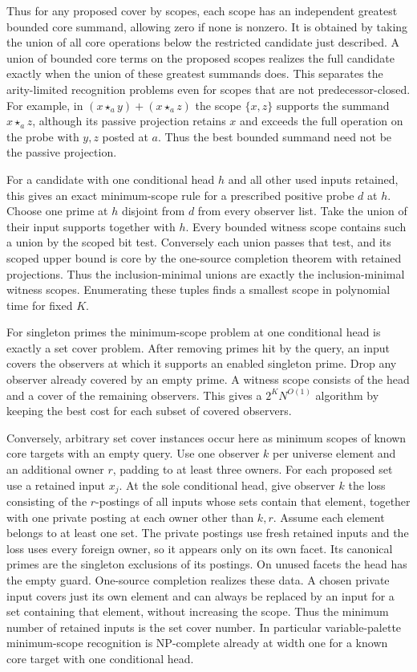 Thus for any proposed cover by scopes, each scope has an
independent greatest bounded core summand, allowing zero if
none is nonzero. It is obtained by taking the union of all
core operations below the restricted candidate just described.
A union of bounded core terms on the proposed scopes realizes
the full candidate exactly when the union of these greatest
summands does. This separates the arity-limited recognition
problems even for scopes that are not predecessor-closed.
For example, in $(x\star_a y)+(x\star_a z)$ the scope
$\{x,z\}$ supports the summand $x\star_a z$, although its
passive projection retains $x$ and exceeds the full operation
on the probe with $y,z$ posted at $a$. Thus the best bounded
summand need not be the passive projection.

For a candidate with one conditional head $h$ and
all other used inputs retained, this gives an exact
minimum-scope rule for a prescribed positive probe $d$
at $h$. Choose one prime at $h$ disjoint from $d$
from every observer list. Take the union of their
input supports together with $h$. Every bounded
witness scope contains such a union by the scoped
bit test. Conversely each union passes that test,
and its scoped upper bound is core by the one-source
completion theorem with retained projections.
Thus the inclusion-minimal unions are exactly the
inclusion-minimal witness scopes. Enumerating these
tuples finds a smallest scope in polynomial time
for fixed $K$.

For singleton primes the minimum-scope problem
at one conditional head is exactly a set cover
problem. After removing primes hit by the query,
an input covers the observers at which it
supports an enabled singleton prime. Drop any
observer already covered by an empty prime.
A witness scope consists of the head and a
cover of the remaining observers. This gives
a $2^K N^{O(1)}$ algorithm by keeping the best
cost for each subset of covered observers.

Conversely, arbitrary set cover instances
occur here as minimum scopes of known core
targets with an empty query. Use one observer
$k$ per universe element and an additional
owner $r$, padding to at least three owners.
For each proposed set use a retained input
$x_j$. At the sole conditional head, give
observer $k$ the loss consisting of the
$r$-postings of all inputs whose sets contain
that element, together with one private
posting at each owner other than $k,r$.
Assume each element belongs to at least one
set. The private postings use fresh retained
inputs and the loss uses every foreign owner,
so it appears only on its own facet. Its
canonical primes are the singleton exclusions
of its postings. On unused facets the head
has the empty guard. One-source completion
realizes these data. A chosen private input
covers just its own element and can always
be replaced by an input for a set containing
that element, without increasing the scope.
Thus the minimum number of retained inputs
is the set cover number. In particular
variable-palette minimum-scope recognition is
NP-complete already at width one for a
known core target with one conditional head.

